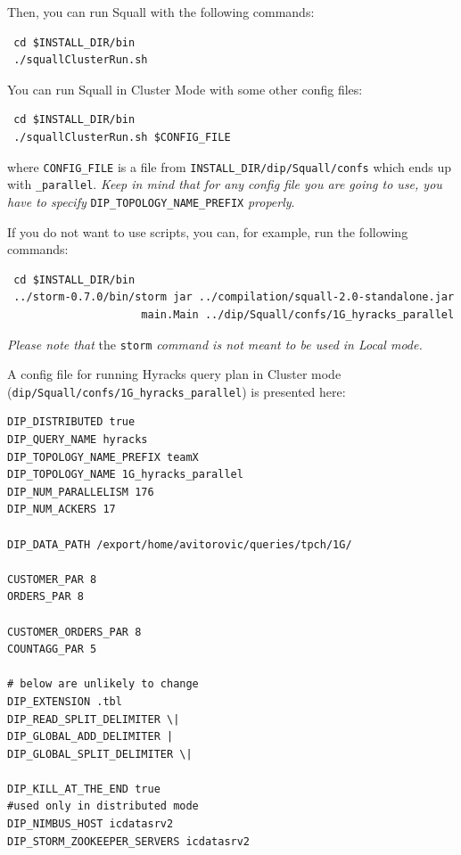 \documentclass[a4paper,10pt]{article}
\begin{document}
Then, you can run Squall with the following commands:
\begin{verbatim}
 cd $INSTALL_DIR/bin
 ./squallClusterRun.sh
\end{verbatim}

You can run Squall in Cluster Mode with some other config files:
\begin{verbatim}
 cd $INSTALL_DIR/bin
 ./squallClusterRun.sh $CONFIG_FILE
\end{verbatim}
where \verb#CONFIG_FILE# is a file from \verb#INSTALL_DIR/dip/Squall/confs# which ends up with \verb#_parallel#. \textit{Keep in mind that for any config file you are going to use, you have to specify} \verb#DIP_TOPOLOGY_NAME_PREFIX# \textit{properly}.

If you do not want to use scripts, you can, for example, run the following commands:
\begin{verbatim}
 cd $INSTALL_DIR/bin
 ../storm-0.7.0/bin/storm jar ../compilation/squall-2.0-standalone.jar
                     main.Main ../dip/Squall/confs/1G_hyracks_parallel
\end{verbatim}

\textit{Please note that} the \verb|storm| \textit{command is not meant to be used in Local mode.}

A config file for running Hyracks query plan in Cluster mode \\(\verb#dip/Squall/confs/1G_hyracks_parallel#) is presented here:
\begin{verbatim}
DIP_DISTRIBUTED true
DIP_QUERY_NAME hyracks
DIP_TOPOLOGY_NAME_PREFIX teamX
DIP_TOPOLOGY_NAME 1G_hyracks_parallel
DIP_NUM_PARALLELISM 176
DIP_NUM_ACKERS 17

DIP_DATA_PATH /export/home/avitorovic/queries/tpch/1G/

CUSTOMER_PAR 8
ORDERS_PAR 8

CUSTOMER_ORDERS_PAR 8
COUNTAGG_PAR 5

# below are unlikely to change
DIP_EXTENSION .tbl
DIP_READ_SPLIT_DELIMITER \|
DIP_GLOBAL_ADD_DELIMITER |
DIP_GLOBAL_SPLIT_DELIMITER \|

DIP_KILL_AT_THE_END true
#used only in distributed mode
DIP_NIMBUS_HOST icdatasrv2
DIP_STORM_ZOOKEEPER_SERVERS icdatasrv2
\end{verbatim}
\end{document}
